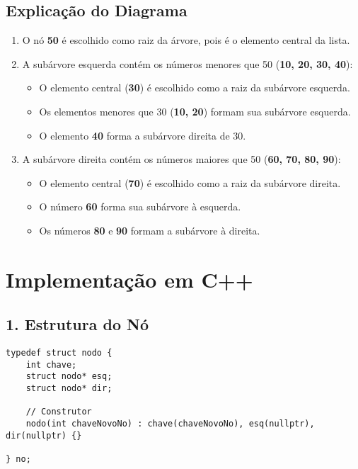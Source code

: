 \documentclass[a4paper,12pt]{article}
\begin{document}
\subsection*{Explicação do Diagrama}
\begin{enumerate}
    \item O nó \textbf{50} é escolhido como raiz da árvore, pois é o elemento central da lista.
    \item A subárvore esquerda contém os números menores que 50 (\textbf{10, 20, 30, 40}):
    \begin{itemize}
        \item O elemento central (\textbf{30}) é escolhido como a raiz da subárvore esquerda.
        \item Os elementos menores que 30 (\textbf{10, 20}) formam sua subárvore esquerda.
        \item O elemento \textbf{40} forma a subárvore direita de 30.
    \end{itemize}
    \item A subárvore direita contém os números maiores que 50 (\textbf{60, 70, 80, 90}):
    \begin{itemize}
        \item O elemento central (\textbf{70}) é escolhido como a raiz da subárvore direita.
        \item O número \textbf{60} forma sua subárvore à esquerda.
        \item Os números \textbf{80} e \textbf{90} formam a subárvore à direita.
    \end{itemize}
\end{enumerate}

\section*{Implementação em C++}

\subsection*{1. Estrutura do Nó}
\begin{verbatim}
typedef struct nodo {
    int chave;
    struct nodo* esq;
    struct nodo* dir;

    // Construtor
    nodo(int chaveNovoNo) : chave(chaveNovoNo), esq(nullptr), dir(nullptr) {}

} no;
\end{verbatim}
\end{document}
